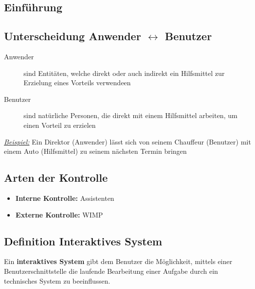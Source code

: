 \documentclass
[
	8pt,		%
	ngerman,	%
	a4paper,	%
	landscape,	%
	final		%
]{extarticle}
\newcommand{\example}{\textit{\underline{Beispiel:} }}
\begin{document}
\begin{multicols*}{4}
	\section{Einführung}
	\subsection{Unterscheidung Anwender \(\leftrightarrow\) Benutzer}
	\begin{description}
		\item[Anwender] sind Entitäten, welche direkt oder auch indirekt ein
		      Hilfsmittel zur Erzielung eines Vorteils verwendeen
		\item[Benutzer] sind natürliche Personen, die direkt mit einem
		      Hilfsmittel arbeiten, um einen Vorteil zu erzielen
	\end{description}
	\example Ein Direktor (Anwender) lässt sich von seinem Chauffeur (Benutzer)
	mit einem Auto (Hilfsmittel) zu seinem nächsten Termin bringen
	\subsection{Arten der Kontrolle}
	\begin{itemize}
		\item \textbf{Interne Kontrolle:} Assistenten
		\item \textbf{Externe Kontrolle:} WIMP
	\end{itemize}
	\subsection{Definition Interaktives System}
	Ein \textbf{interaktives System} gibt dem Benutzer die Möglichkeit, mittels
	einer Benutzerschnittstelle die laufende Bearbeitung einer Aufgabe durch ein
	technisches System zu beeinflussen.

\end{multicols*}
\end{document}
